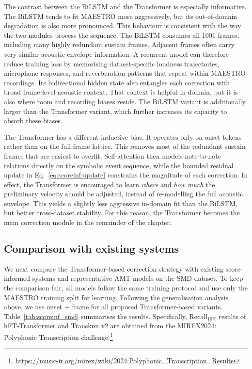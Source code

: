 The contrast between the BiLSTM and the Transformer is especially informative. The BiLSTM tends to fit MAESTRO more aggressively, but its out-of-domain degradation is also more pronounced. This behaviour is consistent with the way the two modules process the sequence. The BiLSTM consumes all 1001 frames, including many highly redundant sustain frames. Adjacent frames often carry very similar acoustic-envelope information. A recurrent model can therefore reduce training loss by memorising dataset-specific loudness trajectories, microphone responses, and reverberation patterns that repeat within MAESTRO recordings. Its bidirectional hidden state also entangles each correction with broad frame-level acoustic context. That context is helpful in-domain, but it is also where room and recording biases reside. The BiLSTM variant is additionally larger than the Transformer variant, which further increases its capacity to absorb these biases.

The Transformer has a different inductive bias. It operates only on onset tokens rather than on the full frame lattice. This removes most of the redundant sustain frames that are easiest to overfit. Self-attention then models note-to-note relations directly on the symbolic event sequence, while the bounded residual update in Eq.~\eqref{eq:scoreinf:update} constrains the magnitude of each correction. In effect, the Transformer is encouraged to learn \emph{where} and \emph{how much} the preliminary velocity should be adjusted, instead of re-modelling the full acoustic envelope. This yields a slightly less aggressive in-domain fit than the BiLSTM, but better cross-dataset stability. For this reason, the Transformer becomes the main correction module in the remainder of the chapter.

\subsection{Comparison with existing systems}
\label{sec:scoreinf:results:comparison}

We next compare the Transformer-based correction strategy with existing score-informed systems and representative AMT models on the SMD dataset. To keep the comparison fair, all models follow the same training protocol and use only the MAESTRO training split for learning. Following the generalisation analysis above, we use onset $+$ frame for all proposed Transformer-based variants. Table~\ref{tab:scoreinf_smd} summarises the results. Specifically, Recall$_{10\%}$ results of hFT-Transformer and Transkun v2 are obtained from the MIREX2024: Polyphonic Transcription challenge.\footnote{\url{https://music-ir.org/mirex/wiki/2024:Polyphonic_Transcription_Results}}

